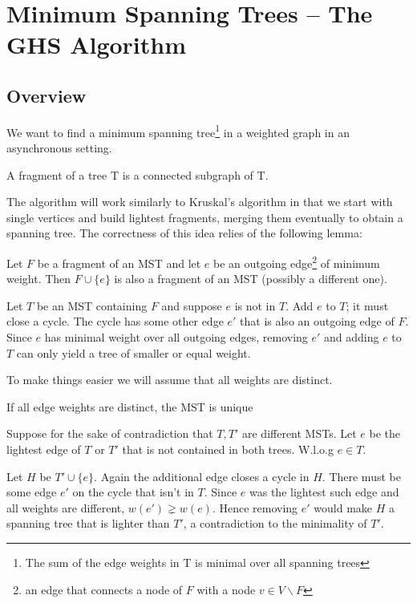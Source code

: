 \section{Minimum Spanning Trees -- The GHS Algorithm}
\subsection{Overview}

We want to find a minimum spanning tree\footnote{The sum of the edge weights in T is minimal over all spanning trees} in a weighted graph in an asynchronous setting. 

\begin{Def}[Fragment] A fragment of a tree T is a connected subgraph of T. \end{Def}

The algorithm will work similarly to Kruskal's algorithm in that we start with single vertices and build lightest fragments, merging them eventually to obtain a spanning tree. The correctness of this idea relies of the following lemma:

\begin{lem} Let $F$ be a fragment of an MST and let $e$ be an outgoing edge\footnote{an edge that connects a node of $F$ with a node $v\in V\backslash F$} of minimum weight. Then $F\cup \{e\}$ is also a fragment of an MST (possibly a different one).\end{lem}

\begin{pr} Let $T$ be an MST containing $F$ and suppose $e$ is not in $T$. Add $e$ to $T$; it must close a cycle. The cycle has some other edge $e'$ that is also an outgoing edge of $F$. Since $e$ has minimal weight over all outgoing edges, removing $e'$ and adding $e$ to $T$ can only yield a tree of smaller or equal weight.\end{pr}

To make things easier we will assume that all weights are distinct.

\begin{lem} If all edge weights are distinct, the MST is unique \end{lem}
\begin{pr} Suppose for the sake of contradiction that $T,T'$ are different MSTs. Let $e$ be the lightest edge of $T$ or $T'$ that is not contained in both trees. W.l.o.g $e\in T$. 

Let $H$ be $T'\cup \{e\}$. Again the additional edge closes a cycle in $H$. There must be some edge $e'$ on the cycle that isn't in $T$. Since $e$ was the lightest such edge and all weights are different, $w(e')\gneq w(e)$. Hence removing $e'$ would make $H$ a spanning tree that is lighter than $T'$, a contradiction to the minimality of $T'$.\end{pr}

